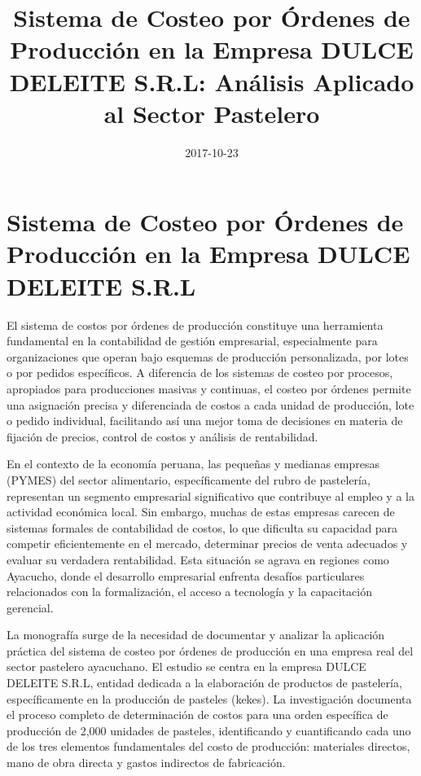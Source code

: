 \documentclass[
  stu,
  floatsintext,
  longtable,
  a4paper,
  nolmodern,
  notxfonts,
  notimes,
  12pt,
  colorlinks=true,linkcolor=blue,citecolor=blue,urlcolor=blue]{apa7}
\title{Sistema de Costeo por Órdenes de Producción en la Empresa DULCE
DELEITE S.R.L: Análisis Aplicado al Sector Pastelero}
\date{2017-10-23}
\begin{document}
\maketitle


\hypertarget{toc}{}
\tableofcontents
\newpage
\section[Introduction]{Sistema de Costeo por Órdenes de Producción en la
Empresa DULCE DELEITE S.R.L}

\setcounter{secnumdepth}{3}

\setlength\LTleft{0pt}




El sistema de costos por órdenes de producción constituye una
herramienta fundamental en la contabilidad de gestión empresarial,
especialmente para organizaciones que operan bajo esquemas de producción
personalizada, por lotes o por pedidos específicos. A diferencia de los
sistemas de costeo por procesos, apropiados para producciones masivas y
continuas, el costeo por órdenes permite una asignación precisa y
diferenciada de costos a cada unidad de producción, lote o pedido
individual, facilitando así una mejor toma de decisiones en materia de
fijación de precios, control de costos y análisis de rentabilidad.

En el contexto de la economía peruana, las pequeñas y medianas empresas
(PYMES) del sector alimentario, específicamente del rubro de pastelería,
representan un segmento empresarial significativo que contribuye al
empleo y a la actividad económica local. Sin embargo, muchas de estas
empresas carecen de sistemas formales de contabilidad de costos, lo que
dificulta su capacidad para competir eficientemente en el mercado,
determinar precios de venta adecuados y evaluar su verdadera
rentabilidad. Esta situación se agrava en regiones como Ayacucho, donde
el desarrollo empresarial enfrenta desafíos particulares relacionados
con la formalización, el acceso a tecnología y la capacitación
gerencial.

La monografía surge de la necesidad de documentar y analizar la
aplicación práctica del sistema de costeo por órdenes de producción en
una empresa real del sector pastelero ayacuchano. El estudio se centra
en la empresa DULCE DELEITE S.R.L, entidad dedicada a la elaboración de
productos de pastelería, específicamente en la producción de pasteles
(kekes). La investigación documenta el proceso completo de determinación
de costos para una orden específica de producción de 2,000 unidades de
pasteles, identificando y cuantificando cada uno de los tres elementos
fundamentales del costo de producción: materiales directos, mano de obra
directa y gastos indirectos de fabricación.
\end{document}
